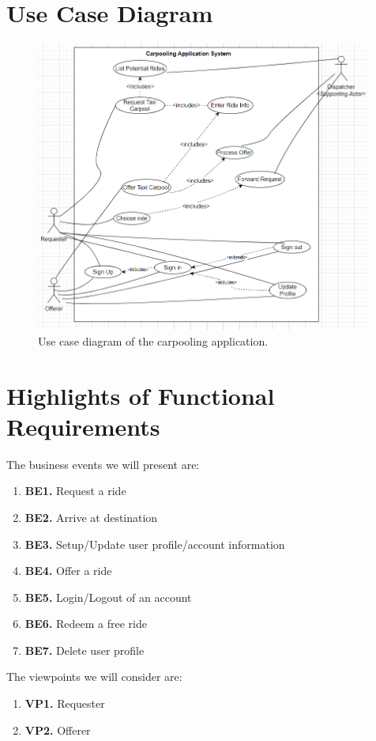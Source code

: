 \documentclass[]{article}
\begin{document}
\newpage\section{Use Case Diagram}
\label{sec:use_case_diagram}
\begin{figure}[h]
	\centering
	\includegraphics[width=30em]{usecase_v3.png}
	\caption{Use case diagram of the carpooling application.}
	\label{fig:usecase}
\end{figure}

\section{Highlights of Functional Requirements}
\label{sec:functional_requirements}
The business events we will present are:
\begin{enumerate}
    \item[] \textbf{BE1.} Request a ride
    \item[] \textbf{BE2.} Arrive at destination
    \item[] \textbf{BE3.} Setup/Update user profile/account information
    \item[] \textbf{BE4.} Offer a ride
    \item[] \textbf{BE5.} Login/Logout of an account
    \item[] \textbf{BE6.} Redeem a free ride
    \item[] \textbf{BE7.} Delete user profile
\end{enumerate}

The viewpoints we will consider are:
\begin{enumerate}
    \item[] \textbf{VP1.} Requester
    \item[] \textbf{VP2.} Offerer
\end{enumerate}
\end{document}
